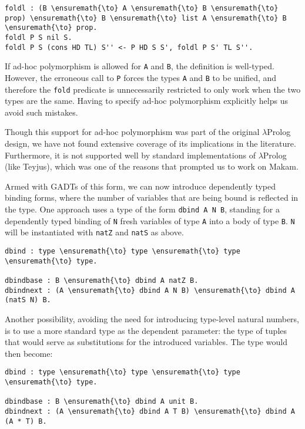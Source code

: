 \begin{verbatim}
foldl : (B \ensuremath{\to} A \ensuremath{\to} B \ensuremath{\to} prop) \ensuremath{\to} B \ensuremath{\to} list A \ensuremath{\to} B \ensuremath{\to} prop.
foldl P S nil S.
foldl P S (cons HD TL) S'' <- P HD S S', foldl P S' TL S''.
\end{verbatim}

If ad-hoc polymorphism is allowed for \texttt{A} and \texttt{B}, the
definition is well-typed. However, the erroneous call to \texttt{P}
forces the types \texttt{A} and \texttt{B} to be unified, and therefore
the \texttt{fold} predicate is unnecessarily restricted to only work
when the two types are the same. Having to specify ad-hoc polymorphism
explicitly helps us avoid such mistakes.

Though this support for ad-hoc polymorphism was part of the original
\ensuremath{\lambda}Prolog design, we have not found extensive coverage of its implications
in the literature. Furthermore, it is not supported well by standard
implementations of \ensuremath{\lambda}Prolog (like Teyjus), which was one of the reasons
that prompted us to work on Makam.

Armed with GADTs of this form, we can now introduce dependently typed
binding forms, where the number of variables that are being bound is
reflected in the type. One approach uses a type of the form
\texttt{dbind\ A\ N\ B}, standing for a dependently typed binding of
\texttt{N} fresh variables of type \texttt{A} into a body of type
\texttt{B}. \texttt{N} will be instantiated with \texttt{natZ} and
\texttt{natS} as above.

\begin{verbatim}
dbind : type \ensuremath{\to} type \ensuremath{\to} type \ensuremath{\to} type. 

dbindbase : B \ensuremath{\to} dbind A natZ B.
dbindnext : (A \ensuremath{\to} dbind A N B) \ensuremath{\to} dbind A (natS N) B.
\end{verbatim}

Another possibility, avoiding the need for introducing type-level
natural numbers, is to use a more standard type as the dependent
parameter: the type of tuples that would serve as substitutions for the
introduced variables. The type would then become:

\begin{verbatim}
dbind : type \ensuremath{\to} type \ensuremath{\to} type \ensuremath{\to} type.

dbindbase : B \ensuremath{\to} dbind A unit B.
dbindnext : (A \ensuremath{\to} dbind A T B) \ensuremath{\to} dbind A (A * T) B.
\end{verbatim}

